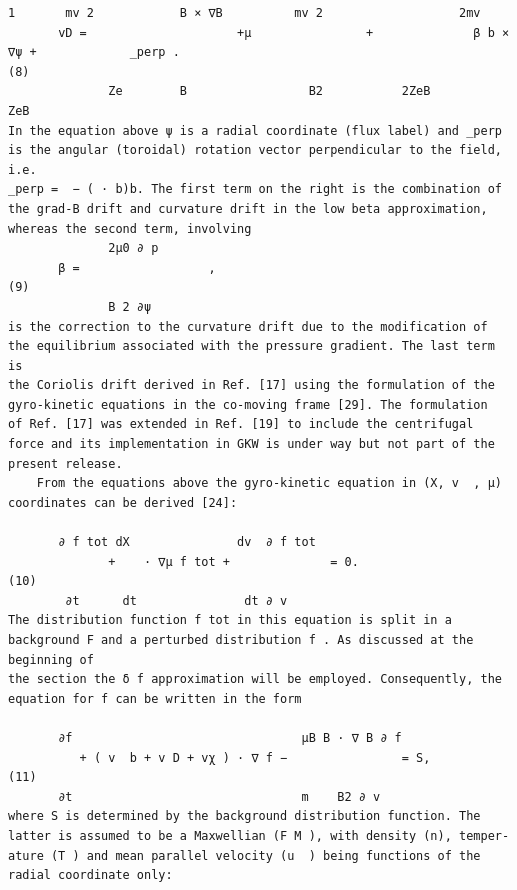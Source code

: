 \documentclass[a4paper]{article}
\newcommand{\gkwpagefont}{\fontsize{6.0pt}{7.55pt}\selectfont}
\begin{document}
\begin{Verbatim}[fontsize=\gkwpagefont]
               1       mv 2            B × ∇B          mv 2                   2mv 
       vD =                     +μ                +              β b × ∇ψ +             _perp .                                              (8)
              Ze        B                 B2           2ZeB                      ZeB
In the equation above ψ is a radial coordinate (flux label) and _perp is the angular (toroidal) rotation vector perpendicular to the field, i.e.
_perp =  − ( · b)b. The first term on the right is the combination of the grad-B drift and curvature drift in the low beta approximation,
whereas the second term, involving
              2μ0 ∂ p
       β =                  ,                                                                                                             (9)
              B 2 ∂ψ
is the correction to the curvature drift due to the modification of the equilibrium associated with the pressure gradient. The last term is
the Coriolis drift derived in Ref. [17] using the formulation of the gyro-kinetic equations in the co-moving frame [29]. The formulation
of Ref. [17] was extended in Ref. [19] to include the centrifugal force and its implementation in GKW is under way but not part of the
present release.
    From the equations above the gyro-kinetic equation in (X, v  , μ) coordinates can be derived [24]:

       ∂ f tot dX               dv  ∂ f tot
              +    · ∇μ f tot +              = 0.                                                                                        (10)
        ∂t      dt               dt ∂ v 
The distribution function f tot in this equation is split in a background F and a perturbed distribution f . As discussed at the beginning of
the section the δ f approximation will be employed. Consequently, the equation for f can be written in the form

       ∂f                                μB B · ∇ B ∂ f
          + ( v  b + v D + vχ ) · ∇ f −                = S,                                                                             (11)
       ∂t                                m    B2 ∂ v
where S is determined by the background distribution function. The latter is assumed to be a Maxwellian (F M ), with density (n), temper-
ature (T ) and mean parallel velocity (u  ) being functions of the radial coordinate only:
                                                                          

\end{Verbatim}
\end{document}
